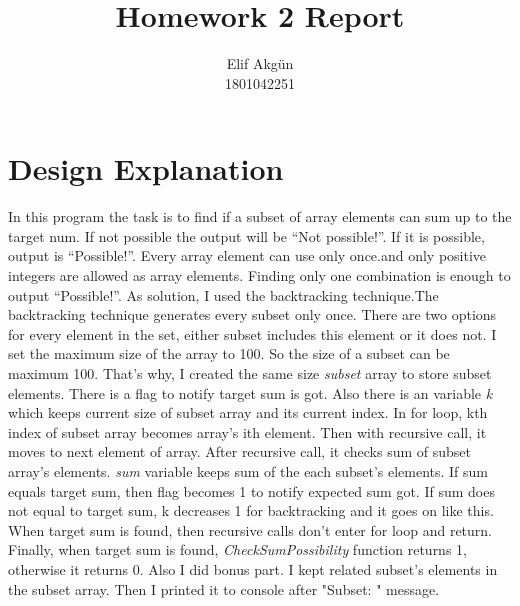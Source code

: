 \documentclass[twoside,11pt]{article}
\newcommand\studentName{Elif Akgün}                  %
\newcommand\studentNumber{1801042251}                %
\begin{document}
    
    \title{Homework 2 Report\assignmentNumber}
    
    \author{\name \studentName \email \studentEmail \\
    \studentNumber
    \addr
    }
    
    \maketitle

\section{Design Explanation} 
\label{sec:background}

In this program the task is to find if a subset of array elements can sum up to the target num. If not possible the output will be “Not possible!”. If it is possible, output is “Possible!”. Every array element can use only once.and only positive integers are allowed as array elements. Finding only one combination is enough to output “Possible!”. \newline
As solution, I used the backtracking technique.The backtracking technique generates every subset only once. There are two options for every element in the set, either subset includes this element or it does not. I set the maximum size of the array to 100. So the size of a subset can be  maximum 100. That's why, I created the same size \emph{subset} array to store subset elements. There is a flag to notify target sum is got. Also there is an variable \emph{k} which keeps current size of subset array and its current index. In for loop, kth index of subset array becomes array's ith element. Then with recursive call, it moves to next element of array. After recursive call, it checks sum of subset array's elements. \emph{sum} variable keeps sum of the each subset's elements. If sum equals target sum, then flag becomes 1 to notify expected sum got. If sum does not equal to target sum, k decreases 1 for backtracking and it goes on like this. When target sum is found, then recursive calls don't enter for loop and return. Finally, when target sum is found, \emph{CheckSumPossibility} function returns 1, otherwise it returns 0. \newline
Also I did bonus part. I kept related subset's elements in the subset array. Then I printed it to console after "Subset: " message.
\end{document}

